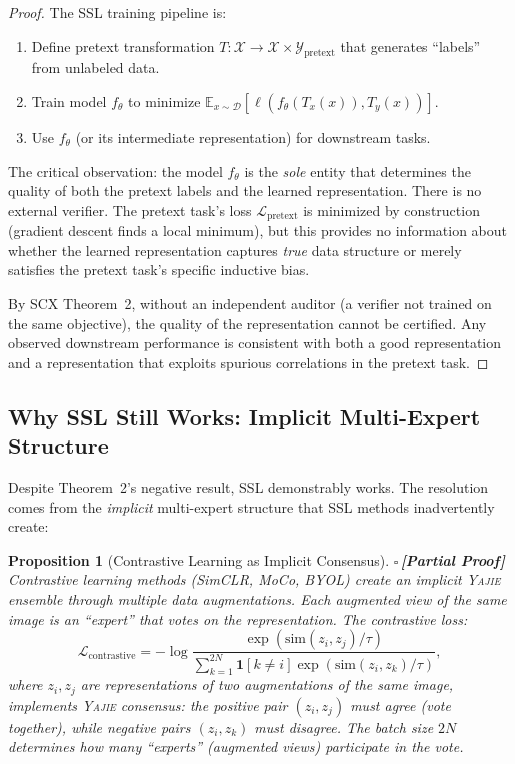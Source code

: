 \documentclass[12pt,a4paper]{article}
\newtheorem{proposition}[theorem]{Proposition}
\theoremstyle{definition}
\newcommand{\rigorPartial}{{\color{rigorcolor}$\square$\,\textbf{[Partial Proof]}}}
\newcommand{\Yajie}{\textsc{Yajie}}
\newcommand{\SCX}{\textsc{SCX}}
\newcommand{\E}{\mathbb{E}}
\newcommand{\cD}{\mathcal{D}}
\newcommand{\cX}{\mathcal{X}}
\newcommand{\cY}{\mathcal{Y}}
\newcommand{\ind}[1]{\mathbf{1}[#1]}
\begin{document}
\begin{proof}
The SSL training pipeline is:
\begin{enumerate}[nosep]
    \item Define pretext transformation $T: \cX \to \cX \times \cY_{\text{pretext}}$ that generates ``labels'' from unlabeled data.
    \item Train model $f_\theta$ to minimize $\E_{x \sim \cD}[\ell(f_\theta(T_x(x)), T_y(x))]$.
    \item Use $f_\theta$ (or its intermediate representation) for downstream tasks.
\end{enumerate}

The critical observation: the model $f_\theta$ is the \emph{sole} entity that determines the quality of both the pretext labels and the learned representation. There is no external verifier. The pretext task's loss $\mathcal{L}_{\text{pretext}}$ is minimized by construction (gradient descent finds a local minimum), but this provides no information about whether the learned representation captures \emph{true} data structure or merely satisfies the pretext task's specific inductive bias.

By \SCX{} Theorem~2, without an independent auditor (a verifier not trained on the same objective), the quality of the representation cannot be certified. Any observed downstream performance is consistent with both a good representation and a representation that exploits spurious correlations in the pretext task.
\end{proof}

\subsection{Why SSL Still Works: Implicit Multi-Expert Structure}

Despite Theorem~2's negative result, SSL demonstrably works. The resolution comes from the \emph{implicit} multi-expert structure that SSL methods inadvertently create:

\begin{proposition}[Contrastive Learning as Implicit Consensus]\label{prop:simclr_consensus}
\rigorPartial
Contrastive learning methods (SimCLR, MoCo, BYOL) create an implicit \Yajie{} ensemble through multiple data augmentations. Each augmented view of the same image is an ``expert'' that votes on the representation. The contrastive loss:
\begin{equation}\label{eq:simclr_loss}
    \mathcal{L}_{\text{contrastive}} = -\log \frac{\exp(\text{sim}(z_i, z_j)/\tau)}{\sum_{k=1}^{2N} \ind{k \neq i} \exp(\text{sim}(z_i, z_k)/\tau)},
\end{equation}
where $z_i, z_j$ are representations of two augmentations of the same image, implements \Yajie{} consensus: the positive pair $(z_i, z_j)$ must agree (vote together), while negative pairs $(z_i, z_k)$ must disagree. The batch size $2N$ determines how many ``experts'' (augmented views) participate in the vote.
\end{proposition}
\end{document}

